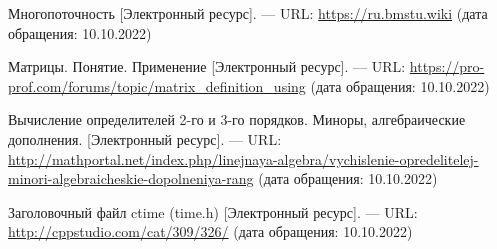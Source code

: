 
\renewcommand\bibname{Список использованных источников}
\begin{thebibliography}{}
  Многопоточность [Электронный ресурс]. --- URL: \url{https://ru.bmstu.wiki} (дата обращения: 10.10.2022)

 Матрицы. Понятие. Применение [Электронный ресурс]. --- URL: \url{https://pro-prof.com/forums/topic/matrix_definition_using} (дата обращения: 10.10.2022)

 Вычисление определителей 2-го и 3-го порядков. Миноры, алгебраические дополнения. [Электронный ресурс]. --- URL: \url{http://mathportal.net/index.php/linejnaya-algebra/vychislenie-opredelitelej-minori-algebraicheskie-dopolneniya-rang} (дата обращения: 10.10.2022)


 Заголовочный файл ctime (time.h) [Электронный ресурс]. --- URL: \url{http://cppstudio.com/cat/309/326/} (дата обращения: 10.10.2022)






\end{thebibliography}
